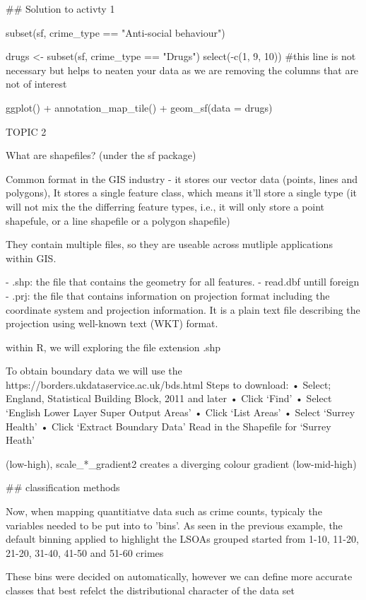 \documentclass[12pt]{article}
\begin{document}
## Solution to activty 1

subset(sf, crime_type == "Anti-social behaviour") 

drugs <- subset(sf, crime_type == "Drugs") %
  select(-c(1, 9, 10))      #this line is not necessary but helps to neaten your data as we are removing the columns that are not of interest

ggplot() +
  annotation_map_tile() +
  geom_sf(data = drugs) 





TOPIC 2 

  What are shapefiles?  (under the sf package)

Common format in the GIS industry - it stores our vector data (points, lines and polygons), It stores a single feature class, which means it'll store a single type (it will not mix the the differring feature types, i.e., it will only store a point shapefule, or a line shapefile or a polygon shapefile) 

They contain multiple files, so they are useable across mutliple applications within GIS.

- .shp: the file that contains the geometry for all features.
- read.dbf untill foreign
- .prj: the file that contains information on projection format including the coordinate system and projection information. It is a plain text file describing the projection using well-known text (WKT) format.


within R, we will exploring the file extension .shp 

To obtain boundary data we will use the https://borders.ukdataservice.ac.uk/bds.html
Steps to download:
•	Select; England, Statistical Building Block, 2011 and later
•	Click ‘Find’
•	Select ‘English Lower Layer Super Output Areas’
•	Click ‘List Areas’
•	Select ‘Surrey Health’
•	Click ‘Extract Boundary Data’
Read in the Shapefile for ‘Surrey Heath’


(low-high), scale_*_gradient2 creates a diverging colour gradient (low-mid-high)


## classification methods

Now, when mapping quantitiatve data such as crime counts, typicaly the variables needed to be put into to 'bins'. As seen in the previous example, the default binning applied to highlight the LSOAs grouped started from 1-10, 11-20, 21-20, 31-40, 41-50 and 51-60 crimes 

These bins were decided on automatically, however we can define more accurate classes that best refelct the distributional character of the data set
\end{document}
